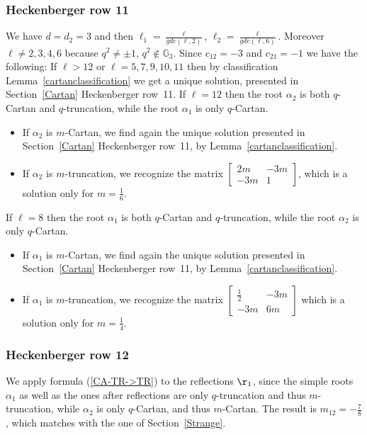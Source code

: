 \documentclass[10pt,a4paper]{amsart}
\numberwithin{equation}{section}
\begin{document}
\subsubsection*{Heckenberger row 11}
We have $d=d_2=3$ and then $\ell_1 = \frac{\ell}{gdc(\ell,2)}$, $\ell_2=\frac{\ell}{gdc(\ell,6)}$. Moreover $\ell \neq 2, 3, 4, 6$ because $q^2 \neq \pm 1$, $q^2 \not\in \mathbb{G}_3$. Since $c_{12}=-3$ and $c_{21}=-1$ we have the following:
If $\ell > 12$ or $\ell =5, 7, 9, 10, 11$ then by classification Lemma~\ref{cartanclassification} we get a unique solution, presented in Section~\ref{Cartan} Heckenberger row~11.
If $\ell = 12$ then the root $\alpha_2$ is both $q$-Cartan and $q$-truncation, while the root $\alpha_1$ is only $q$-Cartan.
\begin{itemize}\itemsep=0pt
	\item If $\alpha_2$ is $m$-Cartan, we find again the unique solution presented in Section~\ref{Cartan} Heckenberger row~11, by Lemma~\ref{cartanclassification}.
	\item If $\alpha_2$ is $m$-truncation, we recognize the matrix
	$\left[\begin{smallmatrix}
 2m & -3m\\
 -3m & 1
\end{smallmatrix}\right]$,
which is a solution only for $m=\frac{1}{6}$.
\end{itemize}
If $\ell = 8$ then the root $\alpha_1$ is both $q$-Cartan and $q$-truncation, while the root $\alpha_2$ is only $q$-Cartan.
\begin{itemize}\itemsep=0pt
	\item If $\alpha_1$ is $m$-Cartan, we find again the unique solution presented in Section~\ref{Cartan} Heckenberger row~11, by Lemma~\ref{cartanclassification}.
	\item If $\alpha_1$ is $m$-truncation, we recognize the matrix $\left[\begin{smallmatrix}
 \frac{1}{2} & -3m\\
 -3m & 6m
\end{smallmatrix}\right]$
which is a solution only for $m=\frac{1}{4}$.
\end{itemize}

\subsubsection*{Heckenberger row 12}
We apply formula (\ref{CA-TR->TR}) to the reflections $\r_1$, since the simple roots $\alpha_1$ as well as the ones after reflections are only $q$-truncation and thus $m$-truncation, while $\alpha_2$ is only $q$-Cartan, and thus $m$-Cartan. The result is $m_{12}=-\frac{7}{8}$, which matches with the one of Section~\ref{Strange}.
\end{document}
